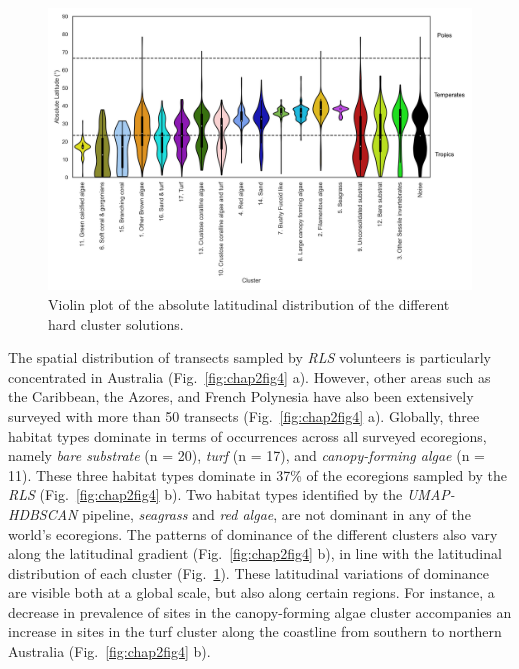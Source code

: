 \begin{refsection}
\begin{figure}
\hypertarget{fig:chap2fig3}{%
\centering
\includegraphics{03-Chapitre2/figures/fig3a.png}
\caption{Violin plot of the absolute latitudinal distribution of the
different hard cluster solutions.}\label{fig:chap2fig3}
}
\end{figure}

The spatial distribution of transects sampled by \emph{RLS} volunteers
is particularly concentrated in Australia (Fig.~\ref{fig:chap2fig4} a).
However, other areas such as the Caribbean, the Azores, and French
Polynesia have also been extensively surveyed with more than 50
transects (Fig.~\ref{fig:chap2fig4} a). Globally, three habitat types
dominate in terms of occurrences across all surveyed ecoregions, namely
\emph{bare substrate} (n = 20), \emph{turf} (n = 17), and
\emph{canopy-forming algae} (n = 11). These three habitat types dominate
in 37\% of the ecoregions sampled by the \emph{RLS}
(Fig.~\ref{fig:chap2fig4} b). Two habitat types identified by the
\emph{UMAP-HDBSCAN} pipeline, \emph{seagrass} and \emph{red algae}, are
not dominant in any of the world's ecoregions. The patterns of dominance
of the different clusters also vary along the latitudinal gradient
(Fig.~\ref{fig:chap2fig4} b), in line with the latitudinal distribution
of each cluster (Fig.~\ref{fig:chap2fig3}). These latitudinal variations
of dominance are visible both at a global scale, but also along certain
regions. For instance, a decrease in prevalence of sites in the
canopy-forming algae cluster accompanies an increase in sites in the
turf cluster along the coastline from southern to northern Australia
(Fig.~\ref{fig:chap2fig4} b).


\end{refsection}
